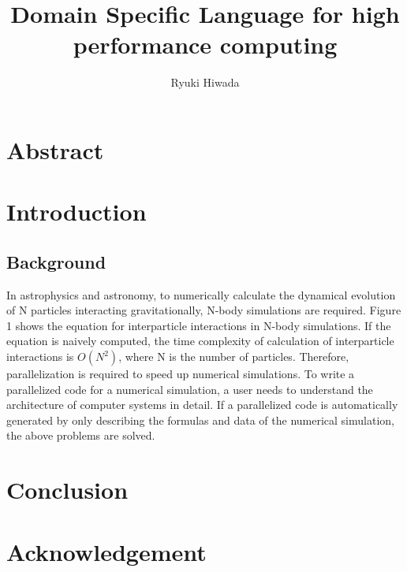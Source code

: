 \documentclass[ams]{U-AizuGT}
\author{Ryuki Hiwada}
\title{Domain Specific Language for high performance computing}
\begin{document}
\maketitle
\section{Abstract}
\section{Introduction}
\subsection{Background}
In astrophysics and astronomy, to numerically calculate 
the dynamical evolution of N particles interacting gravitationally, 
N-body simulations are required. Figure 1 shows the equation for 
interparticle interactions in N-body simulations. If the equation 
is naively computed, the time complexity of calculation of 
interparticle interactions is \begin{math}O(N^2) \end{math}, where N is the number of
particles. Therefore, parallelization is required to speed up 
numerical simulations. To write a parallelized code for a numerical
simulation, a user needs to understand the architecture of computer
systems in detail. If a parallelized code is automatically
generated by only describing the formulas and data of the numerical
simulation, the above problems are solved.
 

\section{Conclusion}
\section{Acknowledgement}

\end{document}
